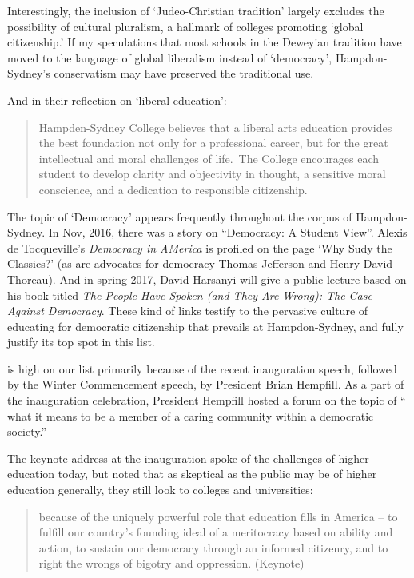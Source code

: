 Interestingly, the inclusion of `Judeo-Christian tradition' largely excludes the possibility of cultural pluralism, a hallmark of colleges promoting `global citizenship.' If my speculations that most schools in the Deweyian tradition have moved to the language of global liberalism instead of `democracy', Hampdon-Sydney's conservatism may have preserved the traditional use. 

And in their reflection on `liberal education': 

\begin{quote}

Hampden-Sydney College believes that a liberal arts education provides the best foundation not only for a professional career, but for the great intellectual and moral challenges of life. The College encourages each student to develop clarity and objectivity in thought, a sensitive moral conscience, and a dedication to responsible citizenship. 
\end{quote}

The topic of `Democracy' appears frequently throughout the corpus of Hampdon-Sydney. In Nov, 2016, there was a story on ``Democracy: A Student View''. Alexis de Tocqueville's \emph{Democracy in AMerica} is profiled on the page `Why Sudy the Classics?' (as are advocates for democracy Thomas Jefferson and Henry David Thoreau). And in spring 2017, David Harsanyi will give a public lecture based on his book titled \emph{The People Have Spoken (and They Are Wrong): The Case Against Democracy}. These kind of links testify to the pervasive culture of educating for democratic citizenship that prevails at Hampdon-Sydney, and fully justify its top spot in this list.

 is high on our list primarily because of the recent inauguration speech, followed by the Winter Commencement speech, by President Brian Hempfill. As a part of the inauguration celebration, President Hempfill hosted a forum on the topic of `` what it means to be a member of a caring community within a democratic society.'' 

The keynote address at the inauguration spoke of the challenges of higher education today, but noted that as skeptical as the public may be of higher education generally, they still look to colleges and universities:

\begin{quote}

because of the uniquely powerful role that education fills in America – to fulfill our country's founding ideal of a meritocracy based on ability and action, to sustain our democracy through an informed citizenry, and to right the wrongs of bigotry and oppression. (Keynote)
\end{quote}

